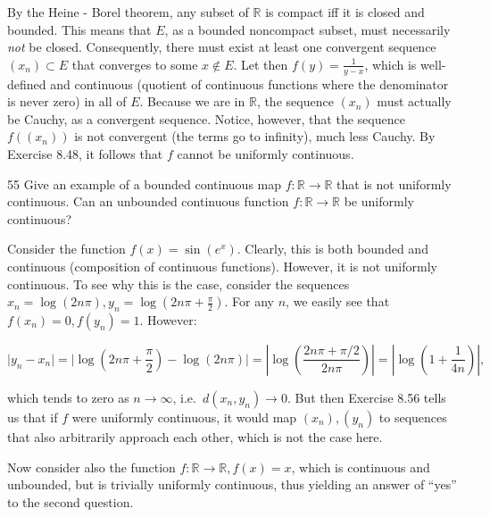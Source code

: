 \begin{solution}
    
    By the Heine - Borel theorem, any subset of $\mathbb{R}$ is compact iff it is closed and bounded.
    This means that $E$, as a bounded noncompact subset, must necessarily \textit{not} be closed.
    Consequently, there must exist at least one convergent sequence $(x_n) \subset E$ that converges to some $x \notin E$.
    Let then $f(y) = \frac{1}{y - x}$, which is well-defined and continuous (quotient of continuous functions where the denominator is never zero) in all of $E$.
    Because we are in $\mathbb{R}$, the sequence $(x_n)$ must actually be Cauchy, as a convergent sequence.
    Notice, however, that the sequence $f((x_n))$ is not convergent (the terms go to infinity), much less Cauchy.
    By Exercise 8.48, it follows that $f$ cannot be uniformly continuous.
\end{solution}

\begin{exercise}{55}
    Give an example of a bounded continuous map $f: \mathbb{R} \rightarrow \mathbb{R}$ that is not uniformly continuous.
    Can an unbounded continuous function $f: \mathbb{R} \rightarrow \mathbb{R}$ be uniformly continuous?
\end{exercise}

\begin{solution}

    Consider the function $f(x) = \sin(e^x)$.
    Clearly, this is both bounded and continuous (composition of continuous functions).
    However, it is not uniformly continuous.
    To see why this is the case, consider the sequences $x_n = \log(2 n \pi), y_n = \log(2n \pi + \frac{\pi}{2})$.
    For any $n$, we easily see that $f(x_n) = 0, f(y_n) = 1$.
    However:

    \[\lvert y_n - x_n \rvert = \lvert \log(2n \pi + \frac{\pi}{2}) - \log(2 n \pi) \rvert = \left\vert \log \left(\frac{2 n \pi + \pi/2}{2 n \pi}\right) \right\vert = \left\vert\log\left(1 + \frac{1}{4n}\right)\right\vert,\]

    which tends to zero as $n \rightarrow \infty$, i.e.\, $d(x_n, y_n) \rightarrow 0$.
    But then Exercise 8.56 tells us that if $f$ were uniformly continuous, it would map $(x_n), (y_n)$ to sequences that also arbitrarily approach each other, which is not the case here.

    Now consider also the function $f: \mathbb{R} \rightarrow \mathbb{R}, f(x) = x$, which is continuous and unbounded, but is trivially uniformly continuous, thus yielding an answer of ``yes'' to the second question.
\end{solution}


